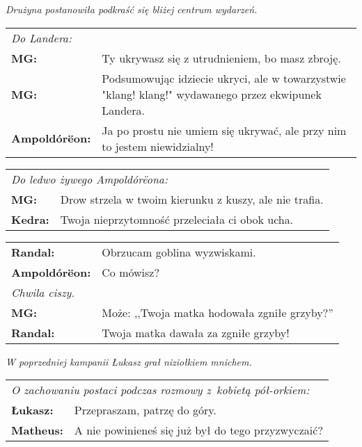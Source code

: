 \documentclass[10pt,twoside,twocolumn]{book}
\begin{document}
\begin{rpg-quotebox}{}
   \textit{Drużyna postanowiła podkraść się bliżej centrum wydarzeń.}\\

   \begin{tabularx}{\columnwidth}{lX}
      \multicolumn{2}{l}{\textit{Do Landera:}}\\
      \textbf{MG:} &  Ty ukrywasz się z utrudnieniem, bo masz zbroję.\\
      \textbf{MG:} &  Podsumowując idziecie ukryci, ale w towarzystwie "klang! klang!" wydawanego przez ekwipunek Landera.\\
      \textbf{Ampoldórëon:} &  Ja po prostu nie umiem się ukrywać, ale przy nim to jestem niewidzialny!\\
   \end{tabularx}
\end{rpg-quotebox}

\begin{rpg-quotebox}{}
   \begin{tabularx}{\columnwidth}{lX}
      \multicolumn{2}{l}{\textit{Do ledwo żywego Ampoldórëona:}}\\
      \textbf{MG:} &  Drow strzela w twoim kierunku z kuszy, ale nie trafia.\\
      \textbf{Kedra:} &  Twoja nieprzytomność przeleciała ci obok ucha.\\
   \end{tabularx}
\end{rpg-quotebox}

\begin{rpg-quotebox}{}
   \begin{tabularx}{\columnwidth}{lX}
      \textbf{Randal:} &  Obrzucam goblina wyzwiskami.\\
      \textbf{Ampoldórëon:} &  Co mówisz?\\
      \multicolumn{2}{l}{\textit{Chwila ciszy.}}\\
      \textbf{MG:} &  Może: ,,Twoja matka hodowała zgniłe grzyby?''\\
      \textbf{Randal:} &  Twoja matka dawała za zgniłe grzyby!\\
   \end{tabularx}
\end{rpg-quotebox}

\begin{rpg-quotebox}{}
   \textit{W poprzedniej kampanii Łukasz grał niziołkiem mnichem.}\\

   \begin{tabularx}{\columnwidth}{lX}
      \multicolumn{2}{X}{\textit{O zachowaniu postaci podczas rozmowy z~kobietą pół-orkiem:}}\\
      \textbf{Łukasz:} & Przepraszam, patrzę do góry.\\
      \textbf{Matheus:} & A nie powinieneś się już był do tego przyzwyczaić?\\
   \end{tabularx}
\end{rpg-quotebox}
\end{document}
